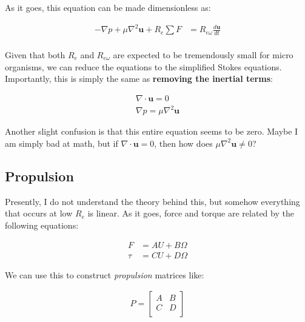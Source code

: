 \documentclass[12pt]{report}
\begin{document}
As it goes, this equation can be made dimensionless as: 

\begin{equation} \label{NS4}
\begin{split}
-\nabla p + \mu \nabla^2\mathbf{u} + R_e\sum F & = R_{e\omega} \frac{d\mathbf{u}}{dt} \\
\end{split}
\end{equation}

Given that both $R_e$ and $R_{e\omega}$ are expected to be tremendously small for micro organisms, we can reduce the equations to the simplified Stokes equations. Importantly, this is simply the same as \textbf{removing the inertial terms}: 

\begin{equation} \label{S1}
\begin{split}
\nabla \cdot \mathbf{u} = 0 \\
\nabla p = \mu \nabla^2\mathbf{u} 
\end{split}
\end{equation}

Another slight confusion is that this entire equation seems to be zero. Maybe I am simply bad at math, but if $\nabla \cdot \mathbf{u} = 0$, then how does $\mu \nabla^2\mathbf{u} \neq 0$?

\subsection{Propulsion}


Presently, I do not understand the theory behind this, but somehow everything that occurs at low $R_e$ is linear. As it goes, force and torque are related by the following equations: 

\begin{equation} \label{Prop1}
\begin{split}
F &= AU + B\Omega \\
\tau &= CU + D\Omega
\end{split}
\end{equation}

We can use this to construct \textit{propulsion} matrices like: 

\begin{align}
P = 
\begin{bmatrix} 
A & B  \\
C & D  \\
\end{bmatrix}
\end{align}
\end{document}
